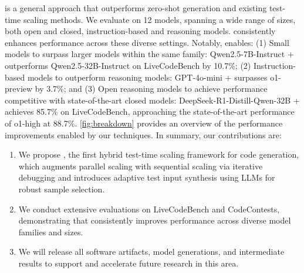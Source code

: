 \frameworkname is a general approach that outperforms zero-shot generation and existing test-time scaling methods. We evaluate \frameworkname on 12 models, spanning a wide range of sizes, both open and closed, instruction-based and reasoning models. \frameworkname consistently enhances performance across these diverse settings. Notably, \frameworkname enables: (1) Small models to surpass larger models within the same family: Qwen2.5-7B-Instruct + \frameworkname outperforms Qwen2.5-32B-Instruct on LiveCodeBench by 10.7\%; (2) Instruction-based models to outperform reasoning models: GPT-4o-mini + \frameworkname surpasses o1-preview by 3.7\%; and (3) Open reasoning models to achieve performance competitive with state-of-the-art closed models: DeepSeek-R1-Distill-Qwen-32B + \frameworkname achieves 85.7\% on LiveCodeBench, approaching the state-of-the-art performance of o1-high at 88.7\%.
\cref{fig:breakdown} provides an overview of the performance improvements enabled by our techniques. %
In summary, our contributions are:

\begin{enumerate}
\item We propose \frameworkname, the first hybrid test-time scaling framework for code generation, which augments parallel scaling with sequential scaling via iterative debugging and introduces adaptive test input synthesis using LLMs for robust sample selection.
\item We conduct extensive evaluations on LiveCodeBench and CodeContests, demonstrating that \frameworkname consistently improves performance across diverse model families and sizes.
\item We will release all software artifacts, model generations, and intermediate results to support and accelerate future research in this area.
\end{enumerate}


